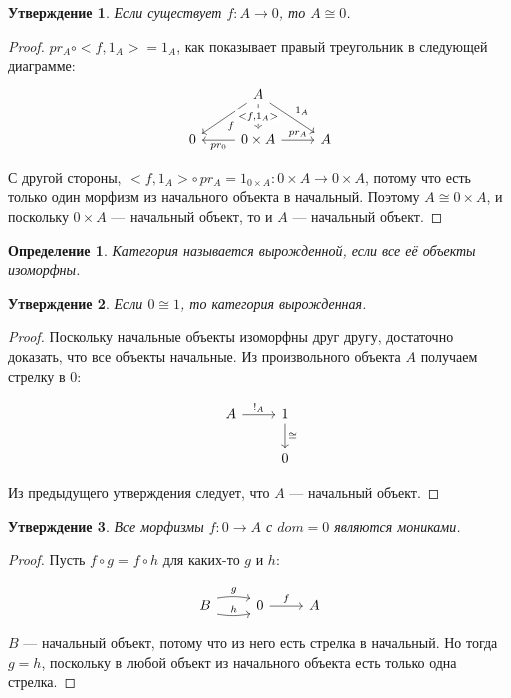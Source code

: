 \documentclass[a4paper, 12pt]{article}
\newtheorem{definition}{Определение}
\newtheorem{exercise}{Утверждение}
\begin{document}
\begin{exercise}
Если существует $f\colon A\to 0$, то $A\cong 0$.
\end{exercise}

\begin{proof}

$pr_A\circ <f, 1_A> = 1_A$, как показывает правый треугольник в следующей диаграмме:
\[
\begin{tikzcd}
& A \arrow{ld}{f}\arrow[dashrightarrow]{d}[description]{<f, 1_A>}\arrow{rd}{1_A} & \\
0 & 0\times A \arrow{l}{pr_0} \arrow{r}{pr_A} & A
\end{tikzcd}
\]

С другой стороны, $<f, 1_A>\circ\,pr_A = 1_{0\times A} \colon 0\times A\to 0\times A$, потому что есть только один морфизм из начального объекта в начальный. Поэтому $A\cong 0\times A$, и поскольку $0\times A$ --- начальный объект, то и $A$ --- начальный объект. 
\end{proof}

\begin{definition}
Категория называется вырожденной, если все её объекты изоморфны.
\end{definition}

\begin{exercise}
Если $0\cong 1$, то категория вырожденная.
\end{exercise}
\begin{proof}
Поскольку начальные объекты изоморфны друг другу, достаточно доказать, что все объекты начальные. Из произвольного объекта $A$ получаем стрелку в $0$:

\[
\begin{tikzcd}
A \arrow{r}{!_A}
& 1 \arrow{d}{\cong} \\
& 0
\end{tikzcd}
\]

Из предыдущего утверждения следует, что $A$ --- начальный объект.\end{proof}

\begin{exercise}
Все морфизмы $f\colon 0\to A$ с $dom = 0$ являются мониками.
\end{exercise}
\begin{proof}
Пусть $f\circ g = f\circ h$ для каких-то $g$ и $h$:

\[
\begin{tikzcd}
B \arrow[shift left=1ex, bend left=10]{r}{g} \arrow[shift right=1ex, bend right=10]{r}{h} & 0 \arrow{r}{f} & A
\end{tikzcd}
\]

$B$ --- начальный объект, потому что из него есть стрелка
в начальный. Но тогда $g = h$, поскольку в любой объект из начального объекта есть только одна стрелка.\end{proof}
\end{document}
